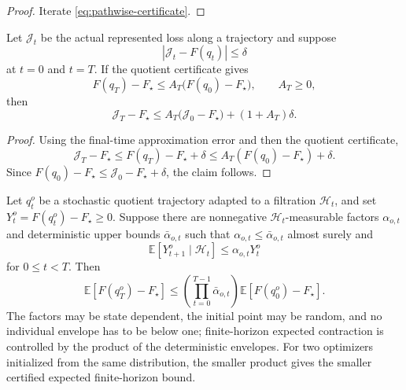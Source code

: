 \begin{proof}
Iterate \eqref{eq:pathwise-certificate}.
\end{proof}

\begin{lemma}
\label{lem:approximate-quotient-transfer}
Let $\mathcal{J}_t$ be the actual represented loss along a trajectory and suppose
\begin{equation}
    |\mathcal{J}_t-F(q_t)|\leq\delta
\end{equation}
at $t=0$ and $t=T$.  If the quotient certificate gives
\begin{equation}
    F(q_T)-F_\star\leq A_T\bigl(F(q_0)-F_\star\bigr),
    \qquad A_T\geq0,
\end{equation}
then
\begin{equation}
    \mathcal{J}_T-F_\star
    \leq
    A_T\bigl(\mathcal{J}_0-F_\star\bigr)+(1+A_T)\delta .
    \label{eq:approximate-quotient-transfer}
\end{equation}
\end{lemma}

\begin{proof}
Using the final-time approximation error and then the quotient certificate,
\begin{equation}
    \mathcal{J}_T-F_\star
    \leq F(q_T)-F_\star+\delta
    \leq A_T(F(q_0)-F_\star)+\delta .
\end{equation}
Since $F(q_0)-F_\star\leq \mathcal{J}_0-F_\star+\delta$, the claim follows.
\end{proof}

\begin{proposition}
\label{prop:expected-contraction-certificate}
Let $q_t^o$ be a stochastic quotient trajectory adapted to a filtration
$\mathcal{H}_t$, and set $Y_t^o=F(q_t^o)-F_\star\geq0$.  Suppose there are
nonnegative $\mathcal{H}_t$-measurable factors $\alpha_{o,t}$ and deterministic upper
bounds $\bar\alpha_{o,t}$ such that $\alpha_{o,t}\leq\bar\alpha_{o,t}$ almost surely and
\begin{equation}
    \mathbb{E}\left[Y_{t+1}^o\mid\mathcal{H}_t\right]
    \leq
    \alpha_{o,t}Y_t^o
    \label{eq:expected-certificate}
\end{equation}
for $0\leq t<T$.  Then
\begin{equation}
    \mathbb{E}\left[F(q_T^o)-F_\star\right]
    \leq
    \left(\prod_{t=0}^{T-1}\bar\alpha_{o,t}\right)
    \mathbb{E}\left[F(q_0^o)-F_\star\right].
    \label{eq:expected-certificate-product}
\end{equation}
The factors may be state dependent, the initial point may be random, and no individual
envelope has to be below one; finite-horizon expected contraction is controlled by the
product of the deterministic envelopes.  For two optimizers initialized from the same
distribution, the smaller product gives the smaller certified expected finite-horizon
bound.
\end{proposition}

